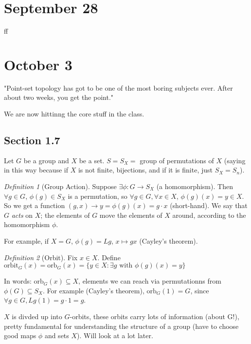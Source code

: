 \documentclass{article}
\theoremstyle{plain}
\theoremstyle{remark}
\newtheorem{definition}{Definition}
\begin{document}
\section{September 28}
ff

\section{October 3}
"Point-set topology has got to be one of the most boring subjects ever.
After about two weeks, you get the point."

We are now hittinng the core stuff in the class.
\subsection{Section 1.7}
Let $G$ be a group and $X$ be a set.
$S = S_X = $ group of permutations of $X$
(saying in this way because if $X$ is not finite, bijections,
and if it is finite, just $S_X = S_n$).

\begin{definition}[Group Action]
	Suppose $\exists \phi \colon G \to S_X$ (a homomorphism).
	Then $\forall g \in G$, $\phi(g) \in S_X$ is a permutation,
	so $\forall g \in G, \forall x \in X$, $\phi(g)(x) = y \in X$.
	So we get a function $(g,x) \to y = \phi(g)(x) = g\cdot x$ (short-hand).
	We say that $G$ \emph{acts} on $X$;
	the elements of $G$ move the elements of $X$ around,
	according to the homomorphism $\phi$.
\end{definition}
For example, if $X = G$, $\phi(g) = Lg$, $x \mapsto gx$ (Cayley's theorem).

\begin{definition}[Orbit]
	Fix $x \in X$.
	Define $\mathrm{orbit}_G(x) = \mathrm{orb}_G(x)
	= \{ y \in X \colon \exists g\text{ with } \phi(g)(x) = y\}$
\end{definition}
In words: $\mathrm{orb}_G(x) \subseteq X$,
elements we can reach via permutationns from $\phi(G) \subseteq S_X$.
For example (Cayley's theorem), $\mathrm{orb}_G(1) = G$,
since $\forall g \in G, Lg(1) = g\cdot 1 = g$.

$X$ is divded up into $G$-orbits,
these orbits carry lots of information (about G!),
pretty fundamental for understanding the structure of a group
(have to choose good maps $\phi$ and sets $X$).
Will look at a lot later.
\end{document}
